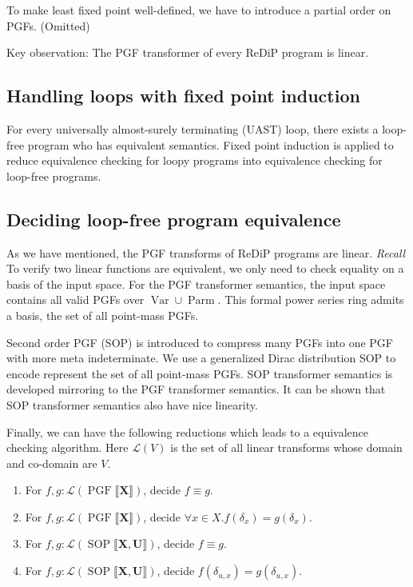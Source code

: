 \documentclass[a4paper]{article}
\DeclareMathOperator*{\PGF}{PGF}
\DeclareMathOperator*{\SOP}{SOP}
\DeclareMathOperator*{\VARS}{Var}
\DeclareMathOperator*{\PARMS}{Parm}
\renewcommand{\S}[1]{ \llbracket #1 \rrbracket }
\begin{document}
To make least fixed point well-defined, we have to introduce a partial order on PGFs. (Omitted)\par
Key observation: The PGF transformer of every ReDiP program is linear.

\subsection{Handling loops with fixed point induction}

For every universally almost-surely terminating (UAST) loop, there exists a loop-free program who has equivalent semantics.
Fixed point induction is applied to reduce equivalence checking for loopy programs into equivalence checking for loop-free programs.

\subsection{Deciding loop-free program equivalence}

As we have mentioned, the PGF transforms of ReDiP programs are linear.
\emph{Recall} To verify two linear functions are equivalent, we only need to check equality on a basis of the input space.
For the PGF transformer semantics, the input space contains all valid PGFs over \(\VARS\cup\PARMS\). This formal power series ring admits a basis, the set of all point-mass PGFs.\par
Second order PGF (SOP) is introduced to compress many PGFs into one PGF with more meta indeterminate.
We use a generalized Dirac distribution SOP to encode represent the set of all point-mass PGFs.
SOP transformer semantics is developed mirroring to the PGF transformer semantics. It can be shown that SOP transformer semantics also have nice linearity.\par
Finally, we can have the following reductions which leads to a equivalence checking algorithm.
Here \(\mathcal{L}(V)\) is the set of all linear transforms whose domain and co-domain are \(V\).

\begin{enumerate}
	\item For \(f, g: \mathcal L (\PGF\S{\mathbf X})\), decide \(f\equiv g\).
	\item For \(f, g: \mathcal L (\PGF\S{\mathbf X})\), decide \(\forall x\in X . f(\delta_{x}) = g(\delta_{x})\).
	\item For \(f, g: \mathcal L (\SOP\S{\mathbf X, \mathbf U})\), decide \(f\equiv g\).
	\item For \(f, g: \mathcal L (\SOP\S{\mathbf X, \mathbf U})\), decide \(f(\delta_{u,x}) = g(\delta_{u,x})\).
\end{enumerate}
\end{document}
